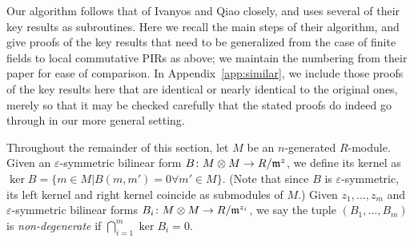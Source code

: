 Our algorithm follows that of Ivanyos and Qiao closely, and uses several of their key results as subroutines. Here we recall the main steps of their algorithm, and give proofs of the key results that need to be generalized from the case of finite fields to local commutative PIRs as above; we maintain the numbering from their paper for ease of comparison. In Appendix~\ref{app:similar}, we include those proofs of the key results here that are identical or nearly identical to the original ones, merely so that it may be checked carefully that the stated proofs do indeed go through in our more general setting.

Throughout the remainder of this section, let $M$ be an $n$-generated $R$-module. Given an $\varepsilon$-symmetric bilinear form $B \colon M \otimes M \to R/\mathfrak{m}^z$, we define its kernel as $\ker B = \{m \in M | B(m,m') = 0 \forall m' \in M\}$. (Note that since $B$ is $\varepsilon$-symmetric, its left kernel and right kernel coincide as submodules of $M$.) Given $z_1, \dotsc, z_m$ and $\varepsilon$-symmetric bilinear forms $B_i \colon M \otimes M \to R/\mathfrak{m}^{z_i}$, we say the tuple $(B_1, \dotsc, B_m)$ is \emph{non-degenerate} if $\bigcap_{i=1}^m \ker B_i = 0$. 


